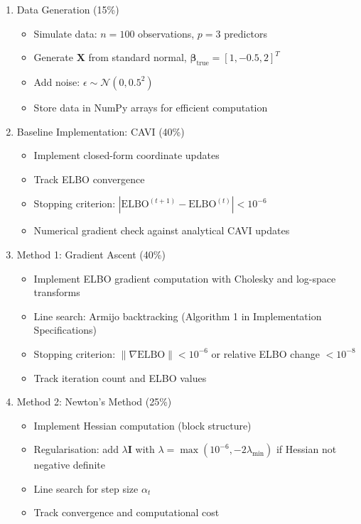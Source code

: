 \documentclass[11pt]{article}
\newcommand{\N}{\mathcal{N}}
\newcommand{\ELBO}{\text{ELBO}}
\begin{document}
\begin{enumerate}[leftmargin=*]
\item Data Generation (15\%)
\begin{itemize}
\item Simulate data: $n = 100$ observations, $p = 3$ predictors
\item Generate $\bm{X}$ from standard normal, $\bm{\beta}_{\text{true}} = [1, -0.5, 2]^T$
\item Add noise: $\epsilon \sim \N(0, 0.5^2)$
\item Store data in NumPy arrays for efficient computation
\end{itemize}

\item Baseline Implementation: CAVI (40\%)
\begin{itemize}
\item Implement closed-form coordinate updates
\item Track ELBO convergence
\item Stopping criterion: $|\ELBO^{(t+1)} - \ELBO^{(t)}| < 10^{-6}$
\item Numerical gradient check against analytical CAVI updates
\end{itemize}

\item Method 1: Gradient Ascent (40\%)
\begin{itemize}
\item Implement ELBO gradient computation with Cholesky and log-space transforms
\item Line search: Armijo backtracking (Algorithm 1 in Implementation Specifications)
\item Stopping criterion: $\|\nabla \ELBO\| < 10^{-6}$ or relative ELBO change $< 10^{-8}$
\item Track iteration count and ELBO values
\end{itemize}

\item Method 2: Newton's Method (25\%)
\begin{itemize}
\item Implement Hessian computation (block structure)
\item Regularisation: add $\lambda \bm{I}$ with $\lambda = \max(10^{-6}, -2\lambda_{\min})$ if Hessian not negative definite
\item Line search for step size $\alpha_t$
\item Track convergence and computational cost
\end{itemize}


\end{enumerate}
\end{document}
